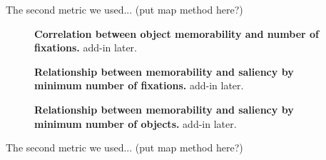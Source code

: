The second metric we used... (put map method here?)

\begin{figure}[t]
\centering
{}
\vspace{-5mm}\caption{\footnotesize\textbf{Correlation between object memorability and number of fixations.} add-in later. }\label{fig:exampleStimuli}
\end{figure}

\begin{figure}[t]
\centering
{}
\vspace{-5mm}\caption{\footnotesize\textbf{Relationship between memorability and saliency by minimum number of fixations.} add-in later. }\label{fig:exampleStimuli}
\end{figure}

\begin{figure}[t]
\centering
{}
\vspace{-5mm}\caption{\footnotesize\textbf{Relationship between memorability and saliency by minimum number of objects.} add-in later. }\label{fig:exampleStimuli}
\end{figure}

The second metric we used... (put map method here?)
